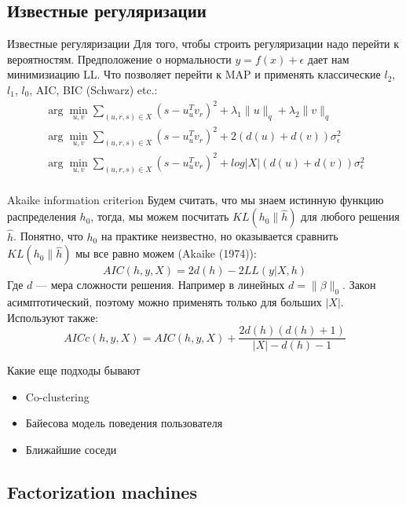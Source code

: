 \documentclass[14pt, fleqn, xcolor={dvipsnames, table}]{beamer}
\begin{document}
\subsection{Известные регуляризации} %
\begin{frame}{Известные регуляризации}
\small
Для того, чтобы строить регуляризации надо перейти к вероятностям. Предположение о нормальности $y = f(x) + \epsilon$ дает нам минимизиацию LL. Что позволяет перейти к MAP и применять классические $l_2$, $l_1$, $l_0$, AIC, BIC (Schwarz) etc.:
$$\begin{array}{c}
\arg \min_{u,v} \sum_{(u,r,s) \in X} (s - u_u^T v_r)^2 + \lambda_1 \|u\|_q + \lambda_2 \|v\|_q \\
\arg \min_{u,v} \sum_{(u,r,s) \in X} (s - u_u^T v_r)^2 + 2 \left(d(u) + d(v)\right) \sigma^2_\epsilon \\
\arg \min_{u,v} \sum_{(u,r,s) \in X} (s - u_u^T v_r)^2 + log |X| \left(d(u) + d(v)\right) \sigma^2_\epsilon\\
\end{array}$$
\end{frame}

\begin{frame}{Akaike information criterion}
\small
Будем считать, что мы знаем истинную функцию распределения $h_0$, тогда, мы можем посчитать $KL(h_0 \| \hat{h})$ для любого решения $\hat{h}$. Понятно, что $h_0$ на практике неизвестно, но оказывается сравнить $KL(h_0 \| \hat{h})$ мы все равно можем (Akaike (1974)):
$$AIC(h, y, X) = 2d(h) - 2 LL(y|X,h)$$
Где $d$ --- мера сложности решения. Например в линейных $d = \|\beta\|_0$. Закон асимптотический, поэтому можно применять только для больших $|X|$. Используют также:
$$
AICc(h, y, X) = AIC(h,y,X) + \frac{2d(h)(d(h) + 1)}{|X| - d(h) - 1}
$$
\end{frame}

\begin{frame}{Какие еще подходы бывают}
\begin{itemize}
  \item Co-clustering
  \item Байесова модель поведения пользователя
  \item Ближайшие соседи  
\end{itemize}
\end{frame}

\subsection{Factorization machines} %
\end{document}
